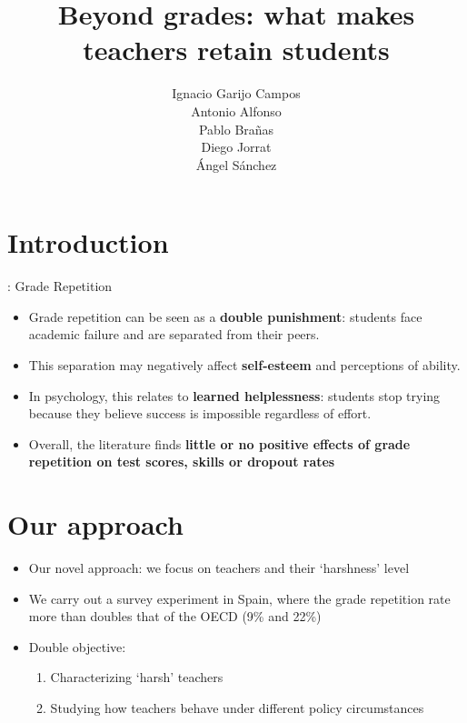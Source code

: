 \documentclass{beamer}
\title[Beyond grades:]{Beyond grades: what makes teachers retain students}
\author[Garijo Campos, Ignacio]{Ignacio Garijo Campos \\
		Antonio Alfonso \\
		Pablo Brañas \\
		Diego Jorrat \\
		Ángel Sánchez 
}
\institute[]{Universidad Loyola Andalucía}
\begin{document}
	

		\maketitle

	
	
	\section{Introduction} \label{intro}
	
	\begin{frame}{: Grade Repetition}
		\begin{itemize}
			\item Grade repetition can be seen as a \textbf{double punishment}: students face academic failure and are separated from their peers.
			\item This separation may negatively affect \textbf{self-esteem} and perceptions of ability.
			\item In psychology, this relates to \textbf{learned helplessness}: students stop trying because they believe success is impossible regardless of effort.
			\item Overall, the literature finds \textbf{little or no positive effects of grade repetition on test scores, skills or dropout rates}
		\end{itemize}
	\end{frame}
	
	
	\section{Our approach}\label{app}
	
	\begin{frame}{}
		\begin{itemize}
			\item Our novel approach: we focus on teachers and their `harshness' level
			\item We carry out a survey experiment in Spain, where the grade repetition rate more than doubles that of the OECD (9\% and 22\%)
			\item Double objective: 
				\begin{enumerate}
					\item Characterizing `harsh' teachers 
					\item Studying how teachers behave under different policy circumstances
				\end{enumerate}
		\end{itemize}
	\end{frame}
	
\end{document}
